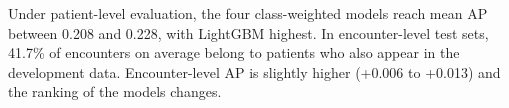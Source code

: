 Under patient-level evaluation, the four class-weighted models reach mean AP between 0.208 and 0.228, with LightGBM highest. In encounter-level test sets, 41.7\% of encounters on average belong to patients who also appear in the development data. Encounter-level AP is slightly higher (+0.006 to +0.013) and the ranking of the models changes.
